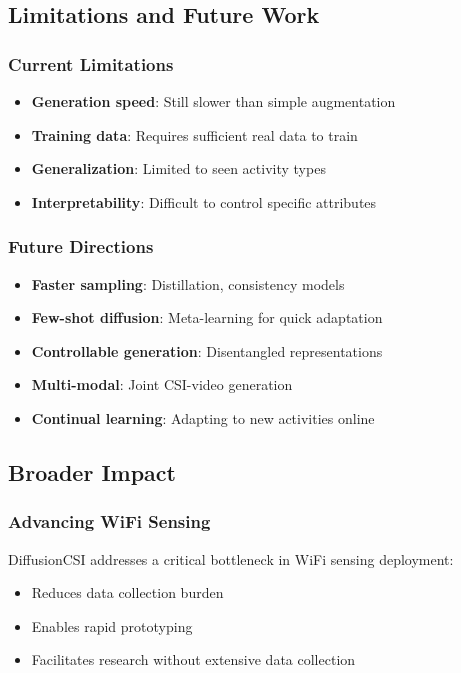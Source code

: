 \documentclass[journal]{IEEEtran}
\begin{document}
\subsection{Limitations and Future Work}

\subsubsection{Current Limitations}
\begin{itemize}
\item \textbf{Generation speed}: Still slower than simple augmentation
\item \textbf{Training data}: Requires sufficient real data to train
\item \textbf{Generalization}: Limited to seen activity types
\item \textbf{Interpretability}: Difficult to control specific attributes
\end{itemize}

\subsubsection{Future Directions}
\begin{itemize}
\item \textbf{Faster sampling}: Distillation, consistency models
\item \textbf{Few-shot diffusion}: Meta-learning for quick adaptation
\item \textbf{Controllable generation}: Disentangled representations
\item \textbf{Multi-modal}: Joint CSI-video generation
\item \textbf{Continual learning}: Adapting to new activities online
\end{itemize}

\subsection{Broader Impact}

\subsubsection{Advancing WiFi Sensing}
DiffusionCSI addresses a critical bottleneck in WiFi sensing deployment:
\begin{itemize}
\item Reduces data collection burden
\item Enables rapid prototyping
\item Facilitates research without extensive data collection
\end{itemize}
\end{document}
